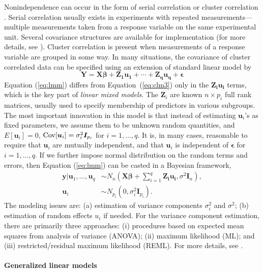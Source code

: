 Nonindependence can occur in the form of serial correlation or cluster correlation
\citep[chapter~17]{rencher2008linear}. Serial correlation usually exists in experiments with
repeated measurements---multiple measurements taken from a response variable on the same
experimental unit. Several covariance structures are available for implementation (for more details,
see \citet[chapter~5]{littell2006sas}).  Cluster correlation is present when measurements of a
response variable are grouped in some way. In many situations, the covariance of cluster correlated
data can be specified using an extension of standard linear model by 
\begin{equation}\label{eq:lmm}
	\bm Y = \bm {X\beta} + \bm {Z_1u_1}+\cdots + \bm {Z_qu_q} + \bm \epsilon	
\end{equation}
Equation (\ref{eq:lmm}) differs from Equation~(\ref{eq:clm3}) only in the $\bm {Z_iu_i}$ terms,
which is the key part of \textit{linear mixed models}.  The $\bm Z_i$  are known $n\times p_i$ full
rank matrices, usually used to specify membership of predictors in various subgroups. The most
important innovation in this model is that instead of estimating $\bm u_i$'s as fixed parameters, we
assume them to be unknown random quantities, and $E[\bm u_i]=0$, $\text{Cov}[\bm u_i]= \sigma_i^2 \bm
I_{p_i}$ for $i=1, \ldots, q$. It is, in many cases, reasonable to require that $\bm u_i$ are
mutually independent, and that $\bm u_i$ is independent of $\bm \epsilon$ for $i=1, \ldots, q$. If
we further impose normal distribution on the random terms and errors, then Equation (\ref{eq:lmm})
can be casted in a Bayesian framework,
\begin{equation}\label{eq:lmmGuass}
	\begin{split}
		\bm y|\bm u_1, \ldots, \bm u_q   & \sim  N_n(\bm {X\beta} + \sum_{i=1}^q \bm {Z_iu_i}, \sigma^2\bm
		I_n),  \\
		\bm u_i &\sim N_{p_i}(0, \sigma_i^2 \bm I_{p_i}).
	\end{split}
\end{equation}
The modeling issues are: (a) estimation of variance components $\sigma_i^2$ and $\sigma^2$; (b)
estimation of random effects $u_i$ if needed. For the variance component estimation, there are
primarily three approaches: (i) procedures based on expected mean squares from analysis of variance
(ANOVA); (ii) maximum likelihood (ML); and (iii) restricted/residual maximum likelihood (REML). For
more details, see \citet[Chapter 1]{littell2006sas}.


\paragraph{Generalized linear models}\label{para:glm}

